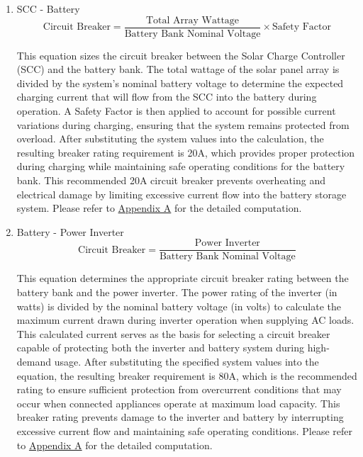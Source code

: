 {\begin{itemize}
\begin{enumerate}[label=\alph*.]
 		\item SCC - Battery
 		\begin{equation}
 			\text{Circuit Breaker} = \frac{\text{Total Array Wattage}}{\text{Battery Bank Nominal Voltage}} \times \text{Safety Factor}
 		\end{equation}
 		
 		
 		This equation sizes the circuit breaker between the Solar Charge Controller (SCC) and the battery bank. The total wattage of the solar panel array is divided by the system’s nominal battery voltage to determine the expected charging current that will flow from the SCC into the battery during operation. A Safety Factor is then applied to account for possible current variations during charging, ensuring that the system remains protected from overload.
 		After substituting the system values into the calculation, the resulting breaker rating requirement is 20A, which provides proper protection during charging while maintaining safe operating conditions for the battery bank. This recommended 20A circuit breaker prevents overheating and electrical damage by limiting excessive current flow into the battery storage system. Please refer to \hyperref[appendix:A]{Appendix A} for the detailed computation.
 		
 		\item Battery - Power Inverter
 		\begin{equation}
 			\text{Circuit Breaker} = \frac{\text{Power Inverter}}{\text{Battery Bank Nominal Voltage}}
 		\end{equation}
 		
 		
 		This equation determines the appropriate circuit breaker rating between the battery bank and the power inverter. The power rating of the inverter (in watts) is divided by the nominal battery voltage (in volts) to calculate the maximum current drawn during inverter operation when supplying AC loads. This calculated current serves as the basis for selecting a circuit breaker capable of protecting both the inverter and battery system during high-demand usage.
 		After substituting the specified system values into the equation, the resulting breaker requirement is 80A, which is the recommended rating to ensure sufficient protection from overcurrent conditions that may occur when connected appliances operate at maximum load capacity. This breaker rating prevents damage to the inverter and battery by interrupting excessive current flow and maintaining safe operating conditions. Please refer to \hyperref[appendix:A]{Appendix A} for the detailed computation.
 		

\end{enumerate}
\end{itemize}}
